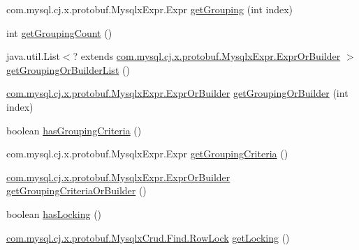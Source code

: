 \begin{DoxyCompactItemize}
\item 
com.\+mysql.\+cj.\+x.\+protobuf.\+Mysqlx\+Expr.\+Expr \mbox{\hyperlink{interfacecom_1_1mysql_1_1cj_1_1x_1_1protobuf_1_1_mysqlx_crud_1_1_find_or_builder_a12af36d29c3685c902f755b1c9cc65a6}{get\+Grouping}} (int index)
\item 
int \mbox{\hyperlink{interfacecom_1_1mysql_1_1cj_1_1x_1_1protobuf_1_1_mysqlx_crud_1_1_find_or_builder_ac654728e46cd1b27c413c8a6409239da}{get\+Grouping\+Count}} ()
\item 
java.\+util.\+List$<$? extends \mbox{\hyperlink{interfacecom_1_1mysql_1_1cj_1_1x_1_1protobuf_1_1_mysqlx_expr_1_1_expr_or_builder}{com.\+mysql.\+cj.\+x.\+protobuf.\+Mysqlx\+Expr.\+Expr\+Or\+Builder}} $>$ \mbox{\hyperlink{interfacecom_1_1mysql_1_1cj_1_1x_1_1protobuf_1_1_mysqlx_crud_1_1_find_or_builder_a5d3dfd17c380aee5028edf37a3bb07b4}{get\+Grouping\+Or\+Builder\+List}} ()
\item 
\mbox{\hyperlink{interfacecom_1_1mysql_1_1cj_1_1x_1_1protobuf_1_1_mysqlx_expr_1_1_expr_or_builder}{com.\+mysql.\+cj.\+x.\+protobuf.\+Mysqlx\+Expr.\+Expr\+Or\+Builder}} \mbox{\hyperlink{interfacecom_1_1mysql_1_1cj_1_1x_1_1protobuf_1_1_mysqlx_crud_1_1_find_or_builder_a0c9e686ea139bc1f2b098a0699da097d}{get\+Grouping\+Or\+Builder}} (int index)
\item 
boolean \mbox{\hyperlink{interfacecom_1_1mysql_1_1cj_1_1x_1_1protobuf_1_1_mysqlx_crud_1_1_find_or_builder_a744b1b20d52871e622e3c308e5689953}{has\+Grouping\+Criteria}} ()
\item 
com.\+mysql.\+cj.\+x.\+protobuf.\+Mysqlx\+Expr.\+Expr \mbox{\hyperlink{interfacecom_1_1mysql_1_1cj_1_1x_1_1protobuf_1_1_mysqlx_crud_1_1_find_or_builder_aaf05b905175f02ee6d2019477108c122}{get\+Grouping\+Criteria}} ()
\item 
\mbox{\hyperlink{interfacecom_1_1mysql_1_1cj_1_1x_1_1protobuf_1_1_mysqlx_expr_1_1_expr_or_builder}{com.\+mysql.\+cj.\+x.\+protobuf.\+Mysqlx\+Expr.\+Expr\+Or\+Builder}} \mbox{\hyperlink{interfacecom_1_1mysql_1_1cj_1_1x_1_1protobuf_1_1_mysqlx_crud_1_1_find_or_builder_aa3db219d43d2cb78b61dab4c4664a793}{get\+Grouping\+Criteria\+Or\+Builder}} ()
\item 
boolean \mbox{\hyperlink{interfacecom_1_1mysql_1_1cj_1_1x_1_1protobuf_1_1_mysqlx_crud_1_1_find_or_builder_ace6f571791cbdea135ec30606b62493d}{has\+Locking}} ()
\item 
\mbox{\hyperlink{enumcom_1_1mysql_1_1cj_1_1x_1_1protobuf_1_1_mysqlx_crud_1_1_find_1_1_row_lock}{com.\+mysql.\+cj.\+x.\+protobuf.\+Mysqlx\+Crud.\+Find.\+Row\+Lock}} \mbox{\hyperlink{interfacecom_1_1mysql_1_1cj_1_1x_1_1protobuf_1_1_mysqlx_crud_1_1_find_or_builder_a708ed27f4814a07b09ba634d37b2a30b}{get\+Locking}} ()

\end{DoxyCompactItemize}
